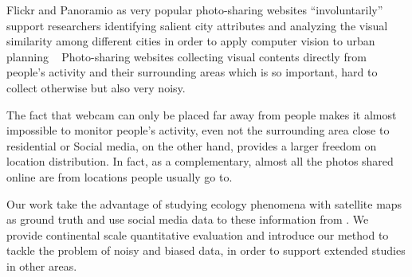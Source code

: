 Flickr and Panoramio as very popular photo-sharing websites 
``involuntarily'' support researchers identifying salient city attributes and analyzing the visual similarity among different cities in order to apply computer vision to urban planning ~\cite{zhou2014recognizing}
Photo-sharing websites collecting visual contents directly from people's activity and their surrounding areas which is so important, hard to collect otherwise but also very noisy. 


The fact that webcam can only be placed far away from people 
 makes it almost impossible to monitor people's activity, even not the surrounding area close to
residential or  Social media, on the other hand, provides a larger freedom on location distribution. 
In fact, as a complementary, almost all the photos shared online are from locations people usually go to. 

Our work take the advantage of studying ecology phenomena with  satellite maps as
 ground truth and use social media data to  these information from . We provide continental scale quantitative evaluation and introduce our
 method to tackle the problem of noisy and biased data, in order to support extended studies in other areas. 

